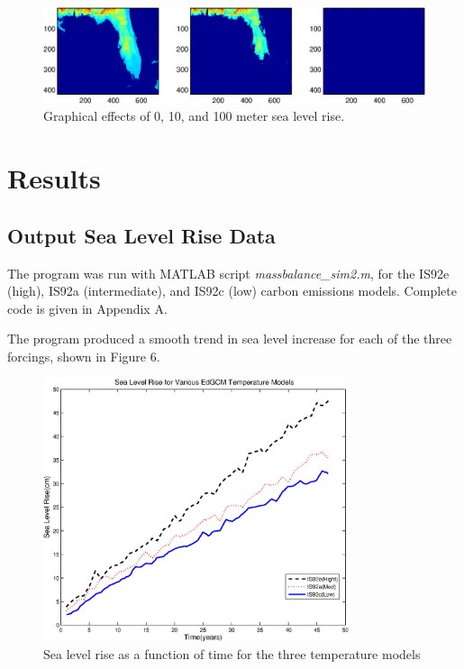 \documentclass[12pt,a4paper,titlepage]{article}
\begin{document}
\begin{figure}[!htb]
\centering
\includegraphics[width=1\textwidth]{fig05.eps} \caption{Graphical effects of 0, 10, and
100 meter sea level rise.}
\end{figure}


\section{Results}

\subsection{Output Sea Level Rise Data}

The program was run with MATLAB script
\textit{massbalance\_sim2.m}, for the IS92e (high), IS92a
(intermediate), and IS92c (low) carbon emissions models. Complete
code is given in Appendix A.

The program produced a smooth trend in sea level increase for each
of the three forcings, shown in Figure 6.

\begin{figure}[!htb]
\centering
\includegraphics[width=0.8\textwidth]{fig06.eps}
\caption{Sea level rise as a function of time for the three
temperature models}
\end{figure}
\end{document}
